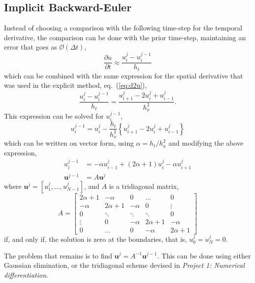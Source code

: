 \documentclass[a4paper,11pt]{article}
\begin{document}
\subsection{Implicit Backward-Euler}
Instead of choosing a comparison with the following time-step for the temporal derivative, the comparison can be done with the prior time-step, maintaining an error that goes as $\mathcal{O}(\Delta t)$,
\begin{equation}
    \frac{\partial u}{\partial t} \approx \frac{u^{j}_i - u^{j-1}_i}{h_t}
    \label{eq:du_impl}
\end{equation}
which can be combined with the same expression for the spatial derivative that was used in the explicit method, eq.~(\ref{eq:d2u}),
\[ \frac{u^{j}_i - u^{j-1}_i}{h_t} = \frac{u^j_{i+1} - 2 u^j_{i} + u^j_{i-1}}{h_x^2}. \]
This expression can be solved for $u^{j-1}_i$,
\[
    u^{j-1}_i = u^{j}_i - \frac{h_t}{h_x^2} \left\{ u^j_{i+1} - 2 u^j_{i} + u^j_{i-1} \right\}
\]
which can be written on vector form, using $\alpha = h_t / h_x^2$ and modifying the above expression,
\begin{align*}
    u^{j-1}_i   &= -\alpha u^j_{i-1} + \left( 2\alpha +1 \right) u^j_{i} - \alpha u^j_{i+1} \\
    \mathbf{u}^{j-1} &= A \mathbf{u}^j
\end{align*}
where $\mathbf{u}^j = [u^j_1, \dots, u^j_{N-1}]$, and $A$ is a tridiagonal matrix,
\[ A = 
    \begin{bmatrix}
        2\alpha+1   & -\alpha& 0        & \dots     & 0 \\
        -\alpha     & 2\alpha+1&-\alpha & 0         & \vdots \\
        0           & \ddots & \ddots   & \ddots    & 0  \\
        \vdots      & 0      &-\alpha   & 2\alpha+1 &-\alpha \\
        0           & \dots  & 0        &-\alpha    & 2\alpha+1
    \end{bmatrix}
\]
if, and only if, the solution is zero at the boundaries, that is, $u^j_0 = u^j_N = 0$.

The problem that remains is to find $\mathbf{u}^j = A^{-1} \mathbf{u}^{j-1}$. This can be done using either Gaussian elimination, or the tridiagonal scheme devised in \textit{Project 1: Numerical differentiation}. 
\end{document}
